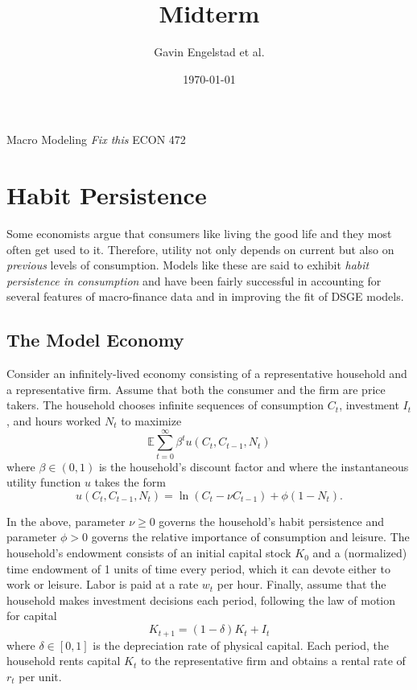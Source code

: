 \documentclass[11pt]{article}
\title{Midterm}
\author{Gavin Engelstad et al.}
\date{\today}
\numberwithin{equation}{section} %
\numberwithin{figure}{section} %
\numberwithin{table}{section} %
\theoremstyle{definition}
\newcommand{\E}{\mathbb{E}}
\newcommand{\theclass}{Macro Modeling}
\newcommand{\theclassnum}{ECON 472}
\begin{document}
\noindent
{\theclass \hfill  \theauthor}\break
{\tiny \hspace*{\fill} \emph{Fix this}} \break
{\theclassnum  \hfill \thedate}

\begin{center}
	{\huge \textbf{\thetitle}}
\end{center}

\section{Habit Persistence}

Some economists argue that consumers like living the good life and they most often get used to it. Therefore, utility not only depends on current but also on \emph{previous} levels of consumption. Models like these are said to exhibit \emph{habit persistence in consumption} and have been fairly successful in accounting for several features of macro-finance data and in improving the fit of DSGE models.


\subsection{The Model Economy}

Consider an infinitely-lived economy consisting of a representative household and a representative firm. Assume that both the consumer and the firm are price takers. The household chooses infinite sequences of consumption $C_t$, investment $I_t$, and hours worked $N_t$ to maximize
\[
    \E \sum_{t=0}^\infty \beta^t u(C_t, C_{t-1}, N_t)
\]
where $\beta \in (0, 1)$ is the household's discount factor and where the instantaneous utility function $u$ takes the form
\[
    u(C_t, C_{t-1}, N_t) = \ln \left(C_t - \nu C_{t-1}\right) + \phi \left(1 - N_t\right).
\]

In the above, parameter $\nu \geq 0$ governs the household's habit persistence and parameter $\phi > 0$ governs the relative importance of consumption and leisure. The household's endowment consists of an initial capital stock $K_0$ and a (normalized) time endowment of 1 units of time every period, which it can devote either to work or leisure. Labor is paid at a rate $w_t$ per hour. Finally, assume that the household makes investment decisions each period, following the law of motion for capital
\[
    K_{t + 1} = (1 - \delta)K_t + I_t
\]
where $\delta \in [0, 1]$ is the depreciation rate of physical capital. Each period, the household rents capital $K_t$ to the representative firm and obtains a rental rate of $r_t$ per unit.
\end{document}
